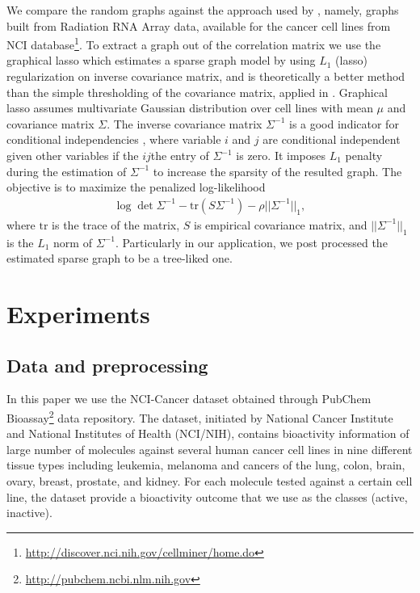 \documentclass[runningheads,a4paper]{llncs}
\begin{document}
We compare the random graphs against the approach used by \cite{su2010}, namely, graphs built from Radiation RNA Array data, available for the cancer cell lines from NCI database\footnote{\url{http://discover.nci.nih.gov/cellminer/home.do}}. To extract a graph out of the correlation matrix we use the graphical lasso \cite{Hastie08}  which estimates a sparse graph model by using {\em $L_1$} (lasso) regularization on inverse covariance matrix, and is theoretically a better method than the simple thresholding of the covariance matrix, applied in \cite{su2010}. Graphical lasso assumes multivariate Gaussian distribution over cell lines with mean $\mu$ and covariance matrix $\Sigma$. The inverse covariance matrix $\Sigma^{-1}$ is a good indicator for conditional independencies \cite{Meinshausen06}, where variable $i$ and $j$ are conditional independent given other variables if the $ij$the entry of $\Sigma^{-1}$ is zero. It imposes {\em $L_1$} penalty during the estimation of $\Sigma^{-1}$ to increase the sparsity of the resulted graph. The objective is to maximize the penalized log-likelihood
\begin{align*}
	\log \det \Sigma^{-1} - \text{tr}(S\Sigma^{-1}) - \rho||\Sigma^{-1}||_1,
\end{align*}
where $\text{tr}$ is the trace of the matrix, $S$ is empirical covariance matrix, and $||\Sigma^{-1}||_1$ is the $L_1$ norm of $\Sigma^{-1}$. Particularly in our application, we post processed the estimated sparse graph to be a tree-liked one.

\section{Experiments}

\subsection{Data and preprocessing}
In this paper we use the NCI-Cancer dataset obtained through PubChem Bioassay\footnote{\url{http://pubchem.ncbi.nlm.nih.gov}} \cite{Bioassay} data repository. The dataset, initiated by National Cancer Institute and National Institutes of Health (NCI/NIH), contains bioactivity information of large number of molecules against several human cancer cell lines in nine different tissue types including leukemia, melanoma and cancers of the lung, colon, brain, ovary, breast, prostate, and kidney. For each molecule tested against a certain cell line, the dataset provide a bioactivity outcome that we use as the classes (active, inactive).
\end{document}
